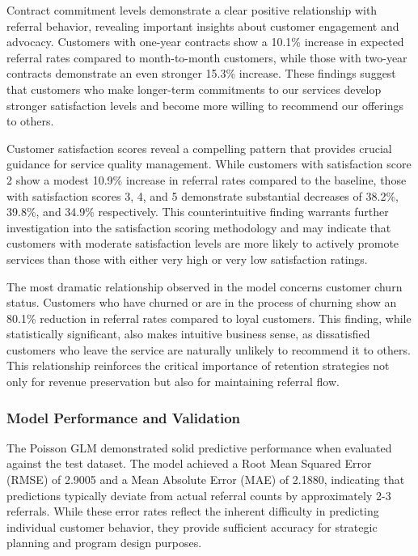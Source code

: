\documentclass[
]{article}
\begin{document}
Contract commitment levels demonstrate a clear positive relationship
with referral behavior, revealing important insights about customer
engagement and advocacy. Customers with one-year contracts show a 10.1\%
increase in expected referral rates compared to month-to-month
customers, while those with two-year contracts demonstrate an even
stronger 15.3\% increase. These findings suggest that customers who make
longer-term commitments to our services develop stronger satisfaction
levels and become more willing to recommend our offerings to others.

Customer satisfaction scores reveal a compelling pattern that provides
crucial guidance for service quality management. While customers with
satisfaction score 2 show a modest 10.9\% increase in referral rates
compared to the baseline, those with satisfaction scores 3, 4, and 5
demonstrate substantial decreases of 38.2\%, 39.8\%, and 34.9\%
respectively. This counterintuitive finding warrants further
investigation into the satisfaction scoring methodology and may indicate
that customers with moderate satisfaction levels are more likely to
actively promote services than those with either very high or very low
satisfaction ratings.

The most dramatic relationship observed in the model concerns customer
churn status. Customers who have churned or are in the process of
churning show an 80.1\% reduction in referral rates compared to loyal
customers. This finding, while statistically significant, also makes
intuitive business sense, as dissatisfied customers who leave the
service are naturally unlikely to recommend it to others. This
relationship reinforces the critical importance of retention strategies
not only for revenue preservation but also for maintaining referral
flow.

\hypertarget{model-performance-and-validation}{%
\subsubsection{Model Performance and
Validation}\label{model-performance-and-validation}}

The Poisson GLM demonstrated solid predictive performance when evaluated
against the test dataset. The model achieved a Root Mean Squared Error
(RMSE) of 2.9005 and a Mean Absolute Error (MAE) of 2.1880, indicating
that predictions typically deviate from actual referral counts by
approximately 2-3 referrals. While these error rates reflect the
inherent difficulty in predicting individual customer behavior, they
provide sufficient accuracy for strategic planning and program design
purposes.
\end{document}
